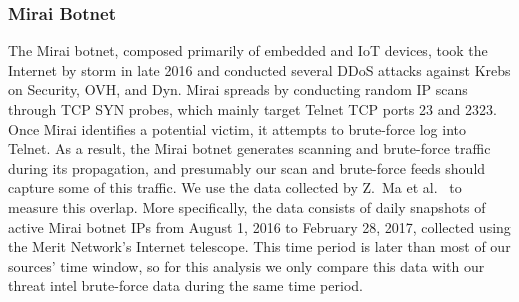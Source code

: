 \subsubsection{Mirai Botnet}
\label{sec:mirai}

The Mirai botnet, composed primarily of embedded and IoT devices, took
the Internet by storm in late 2016 and conducted several DDoS attacks
against Krebs on Security, OVH, and Dyn. Mirai spreads by conducting
random IP scans through TCP SYN probes, which mainly target Telnet TCP
ports 23 and 2323. Once Mirai identifies a potential victim, it
attempts to brute-force log into Telnet. As a result, the Mirai botnet
generates scanning and brute-force traffic during its propagation, and
presumably our scan and brute-force feeds should capture some of this
traffic. We use the data collected by Z.\ Ma et
al.~\cite{antonakakis2017understanding} to measure this overlap.  More
specifically, the data consists of daily snapshots of active Mirai
botnet IPs from August 1, 2016 to February 28, 2017, collected using
the Merit Network's Internet telescope.  This time period is later
than most of our sources' time window, so for this analysis we only
compare this data with our threat intel brute-force data during the
same time period.





